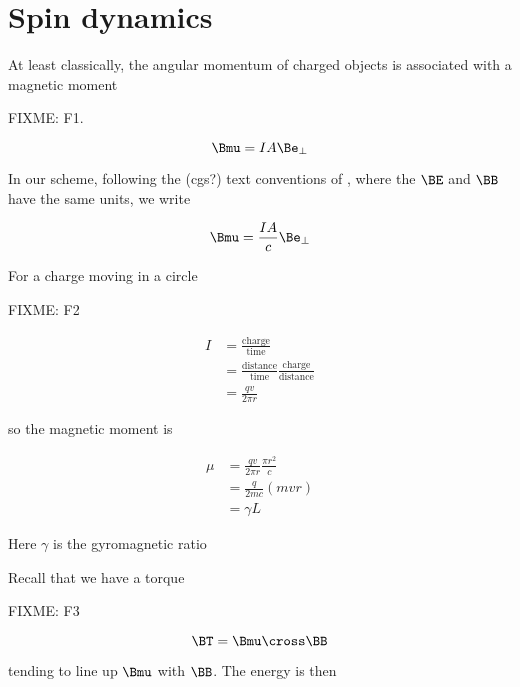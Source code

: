 \section{Spin dynamics}

At least classically, the angular momentum of charged objects is associated with a magnetic moment

FIXME: F1.

\begin{equation}\label{eqn:qmTwoL15:110}
\Bmu = I A \Be_\perp
\end{equation}

In our scheme, following the (cgs?) text conventions of \cite{desai2009quantum}, where the $\BE$ and $\BB$ have the same units, we write

\begin{equation}\label{eqn:qmTwoL15:130}
\Bmu = \frac{I A}{c} \Be_\perp
\end{equation}

For a charge moving in a circle

FIXME: F2

\begin{equation}\label{eqn:qmTwoL15:150}
\begin{aligned}
I 
&= \frac{\text{charge}}{\text{time}} \\
&= 
\frac{\text{distance}}{\text{time}} \frac{\text{charge}}{\text{distance}} \\
&= 
\frac{q v}{ 2 \pi r}
\end{aligned}
\end{equation}

so the magnetic moment is 

\begin{equation}\label{eqn:qmTwoL15:170}
\begin{aligned}
\mu 
&= \frac{q v}{ 2 \pi r} \frac{\pi r^2}{c}  \\
&= \frac{q }{ 2 m c } (m v r) \\
&= \gamma L
\end{aligned}
\end{equation}

Here $\gamma$ is the gyromagnetic ratio

Recall that we have a torque 

FIXME: F3

\begin{equation}\label{eqn:qmTwoL15:190}
\BT = \Bmu \cross \BB
\end{equation}

tending to line up $\Bmu$ with $\BB$.  The energy is then

